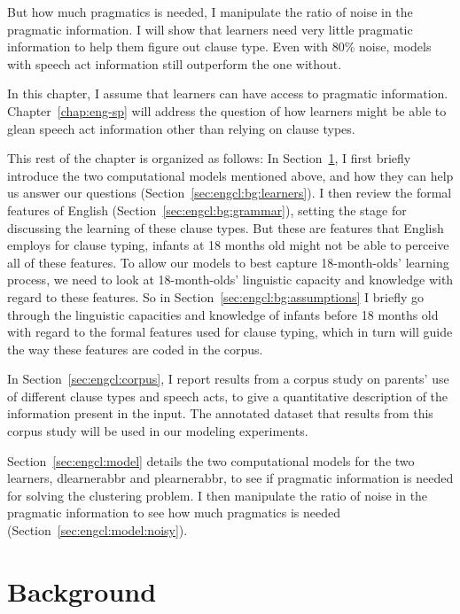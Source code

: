 But how much pragmatics is needed, I manipulate the ratio of noise in the pragmatic information. I will show that learners need very little pragmatic information to help them figure out clause type. Even with 80\% noise, models with speech act information still outperform the one without.

In this chapter, I assume that learners can have access to pragmatic information. Chapter~\ref{chap:eng-sp} will address the question of how learners might be able to glean speech act information other than relying on clause types. 

This rest of the chapter is organized as follows: 
In Section~\ref{sec:engcl:background}, I first briefly introduce the two computational models mentioned above, and how they can help us answer our questions (Section~\ref{sec:engcl:bg:learners}). I then review the formal features of English \diis{} (Section~\ref{sec:engcl:bg:grammar}), setting the stage for discussing the learning of these clause types. But these are features that English employs for clause typing, infants at 18 months old might not be able to perceive all of these features. To allow our models to best capture 18-month-olds' learning process, we need to look at 18-month-olds' linguistic capacity and knowledge with regard to these features. So in Section~\ref{sec:engcl:bg:assumptions} I briefly go through the linguistic capacities and knowledge of infants before 18 months old with regard to the formal features used for clause typing, which in turn will guide the way these features are coded in the corpus. 

In Section~\ref{sec:engcl:corpus}, I report results from a corpus study on parents' use of different clause types and speech acts, to give a quantitative description of the information present in the input. The annotated dataset that results from this corpus study will be used in our modeling experiments.

Section~\ref{sec:engcl:model} details the two computational models for the two learners, \gls{dlearnerabbr} and \gls{plearnerabbr}, to see if pragmatic information is needed for solving the clustering problem. I then manipulate the ratio of noise in the pragmatic information to see how much pragmatics is needed (Section~\ref{sec:engcl:model:noisy}). 

\section{Background}
\label{sec:engcl:background}

